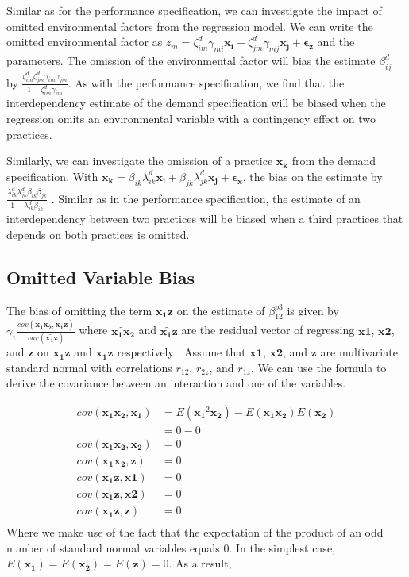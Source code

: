\documentclass[12pt]{article}
\begin{document}
Similar as for the performance specification, we can investigate the impact of omitted environmental factors from the regression model. We can write the omitted environmental factor as $z_m = \zeta_{im}^d \gamma_{mi} \mathbf{x_i} +  \zeta_{jm}^d \gamma_{mj} \mathbf{x_j} + \mathbf{\epsilon_z}$ and the parameters. The omission of the environmental factor will bias the estimate $\beta^d_{ij}$ by $\frac{\zeta^d_{im} \zeta^d_ {jm}\gamma_{im} \gamma_{jm}}{1 - \zeta^d_{im} \gamma_{im}}$. As with the performance specification, we find that the interdependency estimate of the demand specification will be biased when the regression omits an environmental variable with a contingency effect on two practices.

Similarly, we can investigate the omission of a practice $\mathbf{x_k}$ from the demand specification. With $\mathbf{x_k} = \beta_{ik} \lambda^d_{ik} \mathbf{x_i} + \beta_{jk} \lambda^d_{jk} \mathbf{x_j} + \mathbf{\epsilon_x}$, the bias on the estimate by $\frac{\lambda^d_{ik} \lambda^d_{jk} \beta_{ik} \beta_{jk}}{1 - \lambda^d_{ik} \beta_{ik}}$ . Similar as in the performance specification, the estimate of an interdependency between two practices will be biased when a third practices that depends on both practices is omitted. 

\subsection{Omitted Variable Bias} \label{appendix-omitted}

The bias of omitting the term $\mathbf{x_1 z}$ on the estimate of $\beta^{p3}_{12}$ is given by $\gamma_1 \frac{cov(\widetilde{\mathbf{x_1 x_2}}, \widetilde{\mathbf{x_1 z}})} {var(\widetilde{\mathbf{x_1 z}})}$ where $\widetilde{\mathbf{x_1 x_2}}$ and $\widetilde{\mathbf{x_1 z}}$ are the residual vector of regressing $\mathbf{x1}$, $\mathbf{x2}$, and $\mathbf{z}$ on $\mathbf{x_1 z}$ and $\mathbf{x_1 z}$ respectively \citep{angrist_mostly_2008,cunningham_causal_2018}. 
Assume that $\mathbf{x1}$, $\mathbf{x2}$, and $\mathbf{z}$ are multivariate standard normal with correlations $r_{12}$, $r_{2z}$, and $r_{1z}$. We can use the \citet{isserlis_formula_1918} formula to derive the covariance between an interaction and one of the variables. 

\begin{align*}
cov(\mathbf{x_1 x_2}, \mathbf{x_1}) &= E(\mathbf{x_1}^2 \mathbf{x_2}) - E(\mathbf{x_1 x_2}) E(\mathbf{x_2}) \\
&= 0 - 0 \\
cov(\mathbf{x_1 x_2}, \mathbf{x_2}) &= 0 \\
cov(\mathbf{x_1 x_2}, \mathbf{z}) &= 0 \\
cov(\mathbf{x_1 z}, \mathbf{x1}) &= 0 \\
cov(\mathbf{x_1 z}, \mathbf{x2}) &= 0 \\
cov(\mathbf{x_1 z}, \mathbf{z}) &= 0 \\
\end{align*}
Where we make use of the fact that the expectation of the product of an odd number of standard normal variables equals 0. In the simplest case, $E(\mathbf{x_1}) =  E(\mathbf{x_2}) = E(\mathbf{z}) = 0$.
As a result,
\end{document}
